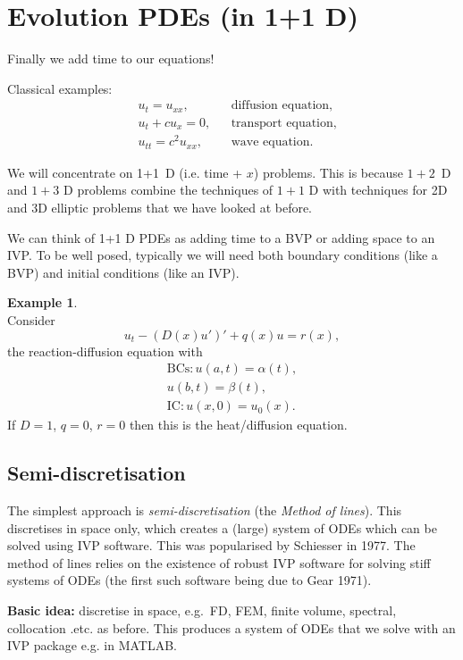 \documentclass[12pt, a4paper]{article}
\theoremstyle{definition}
\newtheorem{example}[thm]{Example}
\theoremstyle{remark}
\numberwithin{equation}{section}
\begin{document}
\newpage
\section{Evolution PDEs (in 1+1 D)}
Finally we add time to our equations!

Classical examples:
\begin{align*}
&u_t=u_{xx}, &&\mbox{diffusion equation},\\
&u_t+cu_x=0, &&\mbox{transport equation},\\
&u_{tt}=c^2u_{xx}, &&\mbox{wave equation}.
\end{align*}

We will concentrate on \mbox{1+1 D} (i.e. time + $x$) problems.
This is because \mbox{$1+2$ D} and $1+3$ D problems combine the techniques of $1+1$ D with techniques for 2D and 3D elliptic problems that we have looked at before.

We can think of 1+1 D PDEs as adding time to a BVP or adding space to an IVP.
To be well posed, typically we will need both boundary conditions (like a BVP) and initial conditions (like an IVP).

\begin{example} \ \\ 
Consider
\begin{equation*}
u_t - (D(x)u')' + q(x)u=r(x),
\end{equation*}
the reaction-diffusion equation with
\begin{align*}
\mbox{BCs}: u(a,t)= \alpha(t),\\
u(b,t)=\beta(t),\\
\mbox{IC}: u(x,0)=u_0(x).
\end{align*}
If $D=1$, $q=0$, $r=0$ then this is the heat/diffusion equation.
\end{example}

\newpage
\subsection{Semi-discretisation}

The simplest approach is \emph{semi-discretisation} (the \emph{Method of lines}). 
This discretises in space only, which creates a (large) system of ODEs which can be solved using IVP software.
This was popularised by Schiesser in 1977. %
The method of lines relies on the existence of robust IVP software for solving stiff systems of ODEs (the first such software being due to Gear 1971).%


{\bf Basic idea:} discretise in space, e.g.\ FD, FEM, finite volume, spectral,  collocation .etc. as before. This produces  a system of ODEs that we solve with an 
IVP package e.g.  in MATLAB. 
\end{document}

